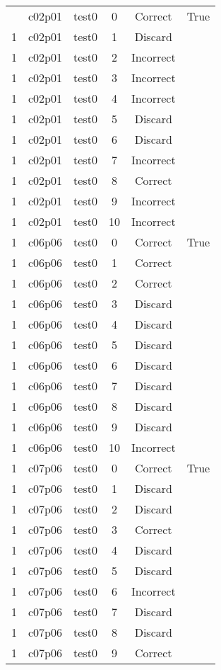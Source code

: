 \begin{longtable}{|c|c|c|c|c|c|}
\hline
\endlastfoot
1 & c02p01 & test0 & 0 & Correct & True \\ 
1 & c02p01 & test0 & 1 & Discard &  \\ 
1 & c02p01 & test0 & 2 & Incorrect &  \\ 
1 & c02p01 & test0 & 3 & Incorrect &  \\ 
1 & c02p01 & test0 & 4 & Incorrect &  \\ 
1 & c02p01 & test0 & 5 & Discard &  \\ 
1 & c02p01 & test0 & 6 & Discard &  \\ 
1 & c02p01 & test0 & 7 & Incorrect &  \\ 
1 & c02p01 & test0 & 8 & Correct &  \\ 
1 & c02p01 & test0 & 9 & Incorrect &  \\ 
1 & c02p01 & test0 & 10 & Incorrect &  \\ 
1 & c06p06 & test0 & 0 & Correct & True \\ 
1 & c06p06 & test0 & 1 & Correct &  \\ 
1 & c06p06 & test0 & 2 & Correct &  \\ 
1 & c06p06 & test0 & 3 & Discard &  \\ 
1 & c06p06 & test0 & 4 & Discard &  \\ 
1 & c06p06 & test0 & 5 & Discard &  \\ 
1 & c06p06 & test0 & 6 & Discard &  \\ 
1 & c06p06 & test0 & 7 & Discard &  \\ 
1 & c06p06 & test0 & 8 & Discard &  \\ 
1 & c06p06 & test0 & 9 & Discard &  \\ 
1 & c06p06 & test0 & 10 & Incorrect &  \\ 
1 & c07p06 & test0 & 0 & Correct & True \\ 
1 & c07p06 & test0 & 1 & Discard &  \\ 
1 & c07p06 & test0 & 2 & Discard &  \\ 
1 & c07p06 & test0 & 3 & Correct &  \\ 
1 & c07p06 & test0 & 4 & Discard &  \\ 
1 & c07p06 & test0 & 5 & Discard &  \\ 
1 & c07p06 & test0 & 6 & Incorrect &  \\ 
1 & c07p06 & test0 & 7 & Discard &  \\ 
1 & c07p06 & test0 & 8 & Discard &  \\ 
1 & c07p06 & test0 & 9 & Correct &  \\ 

\end{longtable}
